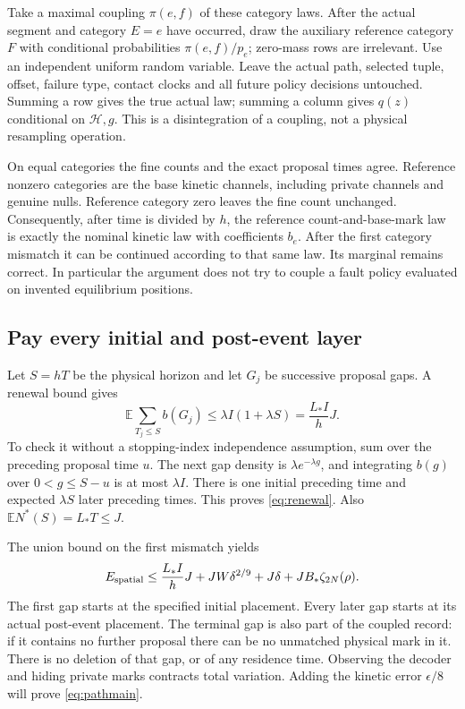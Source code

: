 \documentclass[11pt]{article}
\numberwithin{equation}{section}
\theoremstyle{definition}
\theoremstyle{remark}\newtheorem{remark}[theorem]{Remark}
\newcommand{\E}{\mathbb E}
\begin{document}
Take a maximal coupling $\pi(e,f)$ of these category laws. After the actual
segment and category $E=e$ have occurred, draw the auxiliary reference
category $F$ with conditional probabilities $\pi(e,f)/p_e$; zero-mass
rows are irrelevant. Use an independent uniform random variable. Leave
the actual path, selected tuple, offset, failure type, contact clocks and
all future policy decisions untouched. Summing a row gives the true actual
law; summing a column gives $q(z)$ conditional on $\mathcal H,g$.
This is a disintegration of a coupling, not a physical resampling operation.

On equal categories the fine counts and the exact proposal times agree.
Reference nonzero categories are the base kinetic channels, including
private channels and genuine nulls. Reference category zero leaves the
fine count unchanged. Consequently, after time is divided by $h$, the
reference count-and-base-mark law is exactly the nominal kinetic law with
coefficients $b_e$. After the first category mismatch it can be continued
according to that same law. Its marginal remains correct. In particular the
argument does not try to couple a fault policy evaluated on invented
equilibrium positions.

\subsection{Pay every initial and post-event layer}

Let $S=hT$ be the physical horizon and let $G_j$ be successive proposal
gaps. A renewal bound gives
\begin{equation}\label{eq:renewal}
 \E\sum_{T_j\le S}b(G_j)
 \le\lambda I(1+\lambda S)=\frac{L_*I}{h}J.
\end{equation}
To check it without a stopping-index independence assumption, sum over the
preceding proposal time $u$. The next gap density is
$\lambda e^{-\lambda g}$, and integrating $b(g)$ over $0<g\le S-u$
is at most $\lambda I$. There is one initial preceding time and expected
$\lambda S$ later preceding times. This proves \eqref{eq:renewal}.
Also $\E N^*(S)=L_*T\le J$.

The union bound on the first mismatch yields
\begin{equation}\label{eq:spatialerror}
 E_{\rm spatial}\le
 \frac{L_*I}{h}J+JW\delta^{2/9}+J\delta
                 +JB_*\zeta_{2N}(\rho).
\end{equation}
The first gap starts at the specified initial placement. Every later gap
starts at its actual post-event placement. The terminal gap is also part of
the coupled record: if it contains no further proposal there can be no
unmatched physical mark in it. There is no deletion of that gap, or of any
residence time. Observing the decoder and hiding private marks contracts
total variation. Adding the kinetic error $\epsilon/8$ will prove
\eqref{eq:pathmain}.
\end{document}
